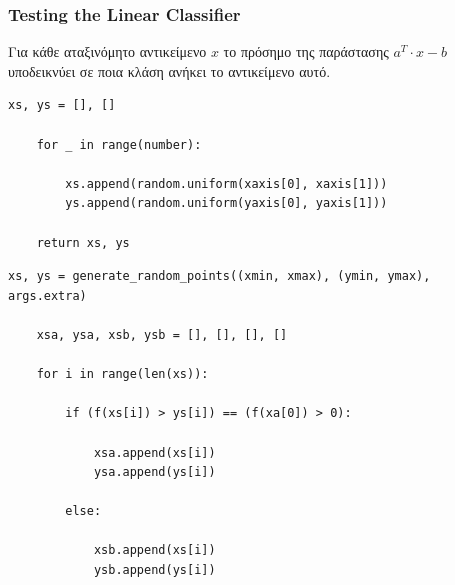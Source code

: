 \documentclass[12pt]{article}
\begin{document}
\pagebreak

\subsubsection{Testing the Linear Classifier}

Για κάθε αταξινόμητο αντικείμενο \( x \) το πρόσημο της παράστασης \( a^{T} \cdot x - b \)
υποδεικνύει σε ποια κλάση ανήκει το αντικείμενο αυτό. \\

\begin{lstlisting}[caption={Η μέθοδος \textit{generate\_random\_points}}]
    xs, ys = [], []

    for _ in range(number):

        xs.append(random.uniform(xaxis[0], xaxis[1]))
        ys.append(random.uniform(yaxis[0], yaxis[1]))

    return xs, ys
\end{lstlisting}

\begin{lstlisting}[caption={Η ταξινόμηση των τυχαίων σημείων βάσει του προσήμου της παράστασης}]
    xs, ys = generate_random_points((xmin, xmax), (ymin, ymax), args.extra)

    xsa, ysa, xsb, ysb = [], [], [], []

    for i in range(len(xs)):

        if (f(xs[i]) > ys[i]) == (f(xa[0]) > 0):

            xsa.append(xs[i])
            ysa.append(ys[i])

        else:

            xsb.append(xs[i])
            ysb.append(ys[i])
\end{lstlisting}
\end{document}
